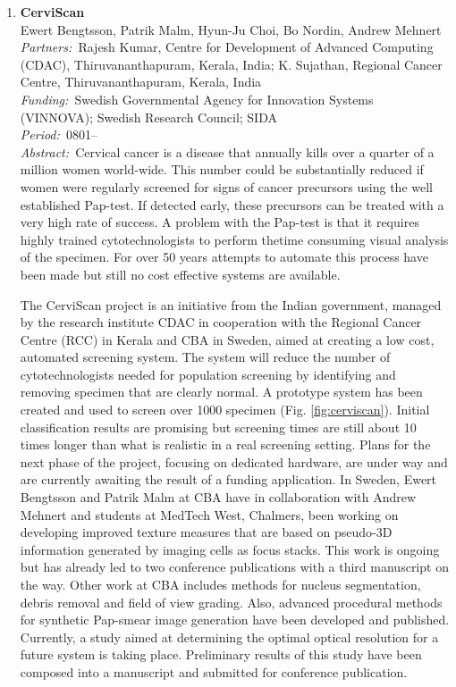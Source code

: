 \documentclass[10pt, a4paper]{article}
\newcommand{\aabstract}[1]{\emph{Abstract:~}#1}
\newcommand{\ffunding}[1]{\emph{Funding:~}#1\\}
\newcommand{\ppartners}[1]{\emph{Partners:~}#1\\}
\newcommand{\pperiod}[1]{\emph{Period:~}#1\\}
\begin{document}
\begin{enumerate}

\item \textbf{CerviScan}\\
Ewert Bengtsson, Patrik Malm, Hyun-Ju Choi, Bo Nordin, Andrew Mehnert\\
\ppartners{Rajesh Kumar, Centre for Development of Advanced Computing (CDAC), Thiruvananthapuram, Kerala, India; K. Sujathan, Regional Cancer Centre, Thiruvananthapuram, Kerala, India}
\ffunding{Swedish Governmental Agency for Innovation Systems (VINNOVA); Swedish Research Council; SIDA}
\pperiod{0801--}
\aabstract{Cervical cancer is a disease that annually kills over a quarter of a million women world-wide. This number could be substantially reduced if women were regularly screened for signs of cancer precursors using the well established Pap-test. If detected early, these precursors can be treated with a very high rate of success. A problem with the Pap-test is that it requires highly trained cytotechnologists to perform thetime consuming visual analysis of the specimen. For over 50 years attempts to automate this process have been made but still no cost effective systems are available.

The CerviScan project is an initiative from the Indian government, managed by the research institute CDAC in cooperation with the Regional Cancer Centre (RCC) in Kerala and CBA in Sweden, aimed at creating a low cost, automated screening system. The system will reduce the number of cytotechnologists needed for population screening by identifying and removing specimen that are clearly normal. A prototype system has been created and used to screen over 1000 specimen (Fig. \ref{fig:cerviscan}). Initial classification results are promising but screening times are still about 10 times longer than what is realistic in a real screening setting. Plans for the next phase of the project, focusing on dedicated hardware, are under way and are currently awaiting the result of a funding application.
\clearpage
In Sweden, Ewert Bengtsson and Patrik Malm at CBA have in collaboration with Andrew Mehnert and students at MedTech West, Chalmers, been working on developing improved texture measures that are based on pseudo-3D information generated by imaging cells as focus stacks. This work is ongoing but has already led to two conference publications with a third manuscript on the way. Other work at CBA includes methods for nucleus segmentation, debris removal and field of view grading. Also, advanced procedural methods for synthetic Pap-smear image generation have been developed and published. Currently, a study aimed at determining the optimal optical resolution for a future system is taking place. Preliminary results of this study have been composed into a manuscript and submitted for conference publication.

}
\end{enumerate}
\end{document}
